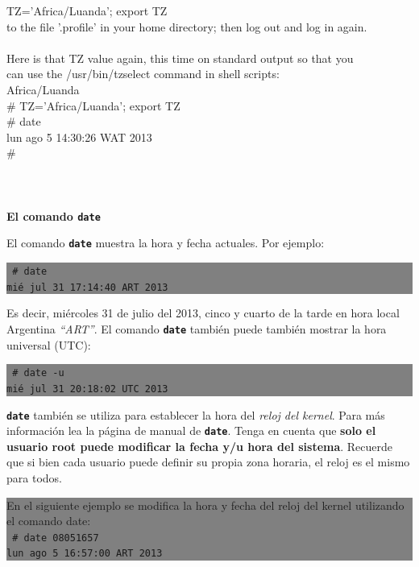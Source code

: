 \documentclass[12pt]{article}
\begin{document}
{{{{	TZ='Africa/Luanda'; export TZ\\
to the file '.profile' in your home directory; then log out and log in again.\\
\\
Here is that TZ value again, this time on standard output so that you\\
can use the /usr/bin/tzselect command in shell scripts:\\
Africa/Luanda\\
\# TZ='Africa/Luanda'; export TZ\\
\# date\\
lun ago  5 14:30:26 WAT 2013\\
\# \\
}
 } \vspace*{0.5cm} } } 
\\ 
\\ 
\\ 
\textbf{El comando \texttt{\textbf{date}}}

El comando \texttt{\textbf{date}} muestra la hora y fecha actuales. Por ejemplo:

\colorbox{grey}{\parbox[t]{0.95\linewidth}{ \vspace*{0.5cm} {\tt 
\# date \\
mié jul 31 17:14:40 ART 2013
 } \vspace*{0.5cm} } } 

Es decir, miércoles 31 de julio del 2013, cinco y cuarto de la tarde en hora local Argentina  \textit{``ART''}.
El comando \texttt{\textbf{date}} también puede también mostrar la hora universal (UTC): 


\colorbox{grey}{\parbox[t]{0.95\linewidth}{ \vspace*{0.5cm} {\tt 
\# date -u\\
mié jul 31 20:18:02 UTC 2013
 } \vspace*{0.5cm} } } 


\texttt{\textbf{date}} también se utiliza para establecer la hora del \textit{reloj del kernel}. Para más información
lea la página de manual de \texttt{\textbf{date}}. Tenga en cuenta que \textbf{solo el usuario root puede 
modificar la fecha y/u hora del sistema}. Recuerde que si bien cada usuario puede definir su propia zona horaria, el reloj 
es el mismo para todos.

\colorbox{grey}{\parbox[t]{0.95\linewidth}{ \vspace*{0.5cm}
En el siguiente ejemplo se modifica la hora y fecha del reloj del kernel 
utilizando el comando date: \\
{\tt 
\# date 08051657 \\
lun ago  5 16:57:00 ART 2013
 } \vspace*{0.5cm} } } 
\end{document}
